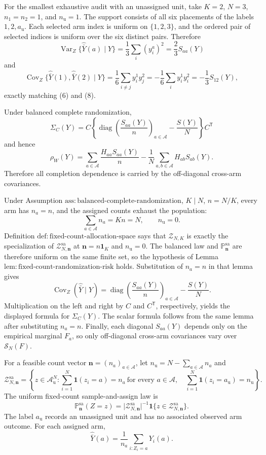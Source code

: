 For the smallest exhaustive audit with an unassigned unit, take \(K=2\), \(N=3\), \(n_1=n_2=1\), and \(n_{\mathrm u}=1\). The support consists of all six placements of the labels \(1,2,a_{\mathrm u}\). Each selected arm index is uniform on \(\{1,2,3\}\), and the ordered pair of selected indices is uniform over the six distinct pairs. Therefore
\[
\operatorname{Var}_Z\{\widehat{\bar Y}(a)\mid Y\}
=\frac13\sum_i(y_i^a)^2=\frac23S_{aa}(Y)
\]
and
\[
\operatorname{Cov}_Z\{\widehat{\bar Y}(1),\widehat{\bar Y}(2)\mid Y\}
=\frac16\sum_{i\ne j}y_i^1y_j^2
=-\frac16\sum_i y_i^1y_i^2=-\frac13S_{12}(Y),
\]
exactly matching (6) and (8).

Under balanced complete randomization,
\[
\Sigma_C(Y)=C\left\{\operatorname{diag}\left(\frac{S_{aa}(Y)}{n}\right)_{a\in\mathcal A}-\frac{S(Y)}{N}\right\}C^{\mathsf T}
\]
and hence
\[
\rho_W(Y)=\sum_{a\in\mathcal A}\frac{H_{aa}S_{aa}(Y)}{n}-\frac{1}{N}\sum_{a,b\in\mathcal A}H_{ab}S_{ab}(Y).
\]
Therefore all completion dependence is carried by the off-diagonal cross-arm covariances.

Under Assumption \(\mathrm{ass{:}balanced\text{-}complete\text{-}randomization}\), \(K\mid N\), \(n=N/K\), every arm has \(n_a=n\), and the assigned counts exhaust the population:
\[
\sum_{a\in\mathcal A}n_a=Kn=N,
\qquad n_{\mathrm u}=0.
\]
Definition \(\mathrm{def{:}fixed\text{-}count\text{-}allocation\text{-}space}\) says that \(\mathcal Z_{N,K}\) is exactly the specialization of \(\mathcal Z_{N,\mathbf n}^{\mathrm{sa}}\) at \(\mathbf n=n\mathbf 1_K\) and \(n_{\mathrm u}=0\). The balanced law and \(\mathbb P_{\mathbf n}^{\mathrm{sa}}\) are therefore uniform on the same finite set, so the hypothesis of Lemma \(\mathrm{lem{:}fixed\text{-}count\text{-}randomization\text{-}risk}\) holds. Substitution of \(n_a=n\) in that lemma gives
\[
\operatorname{Cov}_Z(\widehat{\bar Y}\mid Y)
=\operatorname{diag}\left(\frac{S_{aa}(Y)}n\right)_{a\in\mathcal A}-\frac{S(Y)}N.
\]
Multiplication on the left and right by \(C\) and \(C^{\mathsf T}\), respectively, yields the displayed formula for \(\Sigma_C(Y)\). The scalar formula follows from the same lemma after substituting \(n_a=n\). Finally, each diagonal \(S_{aa}(Y)\) depends only on the empirical marginal \(F_a\), so only off-diagonal cross-arm covariances vary over \(\mathcal S_N(F)\).

For a feasible count vector \(\mathbf n=(n_a)_{a\in\mathcal A}\), let \(n_{\mathrm u}=N-\sum_{a\in\mathcal A}n_a\) and
\[
\mathcal Z_{N,\mathbf n}^{\mathrm{sa}}
=\left\{z\in\mathcal A_{\mathrm u}^{N}:
\sum_{i=1}^{N}\mathbf 1(z_i=a)=n_a\ \text{for every }a\in\mathcal A,
\quad
\sum_{i=1}^{N}\mathbf 1(z_i=a_{\mathrm u})=n_{\mathrm u}
\right\}.
\]
The uniform fixed-count sample-and-assign law is
\[
\mathbb P_{\mathbf n}^{\mathrm{sa}}(Z=z)
=\lvert\mathcal Z_{N,\mathbf n}^{\mathrm{sa}}\rvert^{-1}
\mathbf 1\{z\in\mathcal Z_{N,\mathbf n}^{\mathrm{sa}}\}.
\]
The label \(a_{\mathrm u}\) records an unassigned unit and has no associated observed arm outcome. For each assigned arm,
\[
\widehat{\bar Y}(a)=\frac{1}{n_a}\sum_{i:Z_i=a}Y_i(a).
\]

